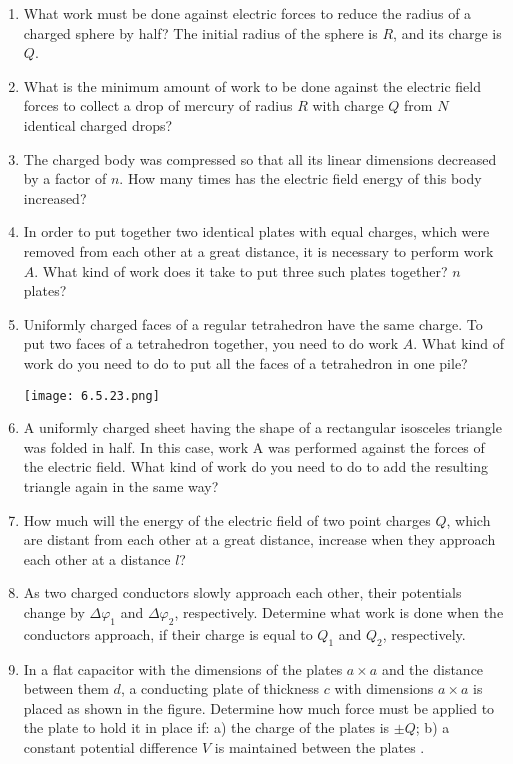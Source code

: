 \documentclass{article}
\begin{document}
\begin{enumerate}[label=6.5.\arabic*]
\item What work must be done against electric forces to reduce the radius of a charged sphere by half? The initial radius of the sphere is $R$, and its charge is $Q$.

\item What is the minimum amount of work to be done against the electric field forces to collect a drop of mercury of radius $R$ with charge $Q$ from $N$ identical charged drops?

\item The charged body was compressed so that all its linear dimensions decreased by a factor of $n$. How many times has the electric field energy of this body increased?

\item In order to put together two identical plates with equal charges, which were removed from each other at a great distance, it is necessary to perform work $A$. What kind of work does it take to put three such plates together? $n$ plates?

\item Uniformly charged faces of a regular tetrahedron have the same charge. To put two faces of a tetrahedron together, you need to do work $A$. What kind of work do you need to do to put all the faces of a tetrahedron in one pile?

\begin{center}
    \texttt{[image: 6.5.23.png]}
\end{center}

\item A uniformly charged sheet having the shape of a rectangular isosceles triangle was folded in half. In this case, work A was performed against the forces of the electric field. What kind of work do you need to do to add the resulting triangle again in the same way?

\item How much will the energy of the electric field of two point charges $Q$, which are distant from each other at a great distance, increase when they approach each other at a distance $l$?

\item As two charged conductors slowly approach each other, their potentials change by $\Delta \varphi_1$ and $\Delta \varphi_2$, respectively. Determine what work is done when the conductors approach, if their charge is equal to $Q_1$ and $Q_2$, respectively.

\item In a flat capacitor with the dimensions of the plates $a \times a$ and the distance between them $d$, a conducting plate of thickness $c$ with dimensions $a \times a$ is placed as shown in the figure. Determine how much force must be applied to the plate to hold it in place if: a) the charge of the plates is $\pm Q$; b) a constant potential difference $V$ is maintained between the plates .


\end{enumerate}
\end{document}
